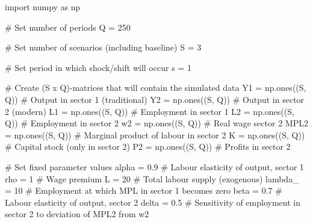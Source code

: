 \documentclass[
  letterpaper,
  DIV=11,
  numbers=noendperiod]{scrreprt}
\newenvironment{Shaded}{\begin{snugshade}}{\end{snugshade}}
\newcommand{\CommentTok}[1]{\textcolor[rgb]{0.37,0.37,0.37}{#1}}
\newcommand{\DecValTok}[1]{\textcolor[rgb]{0.68,0.00,0.00}{#1}}
\newcommand{\FloatTok}[1]{\textcolor[rgb]{0.68,0.00,0.00}{#1}}
\newcommand{\ImportTok}[1]{\textcolor[rgb]{0.00,0.46,0.62}{#1}}
\newcommand{\NormalTok}[1]{\textcolor[rgb]{0.00,0.23,0.31}{#1}}
\newcommand{\OperatorTok}[1]{\textcolor[rgb]{0.37,0.37,0.37}{#1}}
\begin{document}
\begin{tcolorbox}[enhanced jigsaw, titlerule=0mm, breakable, bottomrule=.15mm, toprule=.15mm, colbacktitle=quarto-callout-note-color!10!white, rightrule=.15mm, toptitle=1mm, opacityback=0, left=2mm, coltitle=black, title=\textcolor{quarto-callout-note-color}{\faInfo}\hspace{0.5em}{Python code}, colframe=quarto-callout-note-color-frame, opacitybacktitle=0.6, leftrule=.75mm, bottomtitle=1mm, arc=.35mm, colback=white]

\begin{Shaded}
\begin{Highlighting}[]
\ImportTok{import}\NormalTok{ numpy }\ImportTok{as}\NormalTok{ np}

\CommentTok{\# Set number of periods}
\NormalTok{Q }\OperatorTok{=} \DecValTok{250}

\CommentTok{\# Set number of scenarios (including baseline)}
\NormalTok{S }\OperatorTok{=} \DecValTok{3}

\CommentTok{\# Set period in which shock/shift will occur}
\NormalTok{s }\OperatorTok{=} \DecValTok{1}

\CommentTok{\# Create (S x Q){-}matrices that will contain the simulated data}
\NormalTok{Y1 }\OperatorTok{=}\NormalTok{ np.ones((S, Q))  }\CommentTok{\# Output in sector 1 (traditional)}
\NormalTok{Y2 }\OperatorTok{=}\NormalTok{ np.ones((S, Q))  }\CommentTok{\# Output in sector 2 (modern)}
\NormalTok{L1 }\OperatorTok{=}\NormalTok{ np.ones((S, Q))  }\CommentTok{\# Employment in sector 1}
\NormalTok{L2 }\OperatorTok{=}\NormalTok{ np.ones((S, Q))  }\CommentTok{\# Employment in sector 2}
\NormalTok{w2 }\OperatorTok{=}\NormalTok{ np.ones((S, Q))  }\CommentTok{\# Real wage sector 2}
\NormalTok{MPL2 }\OperatorTok{=}\NormalTok{ np.ones((S, Q))  }\CommentTok{\# Marginal product of labour in sector 2}
\NormalTok{K }\OperatorTok{=}\NormalTok{ np.ones((S, Q))  }\CommentTok{\# Capital stock (only in sector 2)}
\NormalTok{P2 }\OperatorTok{=}\NormalTok{ np.ones((S, Q))  }\CommentTok{\# Profits in sector 2}

\CommentTok{\# Set fixed parameter values}
\NormalTok{alpha }\OperatorTok{=} \FloatTok{0.9}  \CommentTok{\# Labour elasticity of output, sector 1}
\NormalTok{rho }\OperatorTok{=} \DecValTok{1}  \CommentTok{\# Wage premium}
\NormalTok{L }\OperatorTok{=} \DecValTok{20}  \CommentTok{\# Total labour supply (exogenous)}
\NormalTok{lambda\_ }\OperatorTok{=} \DecValTok{10}  \CommentTok{\# Employment at which MPL in sector 1 becomes zero}
\NormalTok{beta }\OperatorTok{=} \FloatTok{0.7}  \CommentTok{\# Labour elasticity of output, sector 2}
\NormalTok{delta }\OperatorTok{=} \FloatTok{0.5}  \CommentTok{\# Sensitivity of employment in sector 2 to deviation of MPL2 from w2}


\end{Highlighting}
\end{Shaded}
\end{tcolorbox}
\end{document}
